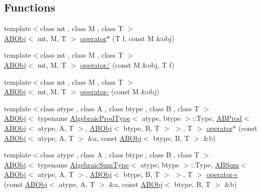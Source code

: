 \subsection*{Functions}
\begin{DoxyCompactItemize}
\item 
{\footnotesize template$<$class mt , class M , class T $>$ }\\\mbox{\hyperlink{classROOT_1_1Minuit2_1_1ABObj}{A\+B\+Obj}}$<$ mt, M, T $>$ \mbox{\hyperlink{namespaceROOT_1_1Minuit2_a03054cc34855692b00d3dd16a0389195}{operator$\ast$}} (T f, const M \&obj)
\item 
{\footnotesize template$<$class mt , class M , class T $>$ }\\\mbox{\hyperlink{classROOT_1_1Minuit2_1_1ABObj}{A\+B\+Obj}}$<$ mt, M, T $>$ \mbox{\hyperlink{namespaceROOT_1_1Minuit2_acfd7451cf386a28e70ea5be0965f631a}{operator/}} (const M \&obj, T f)
\item 
{\footnotesize template$<$class mt , class M , class T $>$ }\\\mbox{\hyperlink{classROOT_1_1Minuit2_1_1ABObj}{A\+B\+Obj}}$<$ mt, M, T $>$ \mbox{\hyperlink{namespaceROOT_1_1Minuit2_a95351951cc1f33b0a2904a47adacd999}{operator-\/}} (const M \&obj)
\item 
{\footnotesize template$<$class atype , class A , class btype , class B , class T $>$ }\\\mbox{\hyperlink{classROOT_1_1Minuit2_1_1ABObj}{A\+B\+Obj}}$<$ typename \mbox{\hyperlink{classROOT_1_1Minuit2_1_1AlgebraicProdType}{Algebraic\+Prod\+Type}}$<$ atype, btype $>$\+::Type, \mbox{\hyperlink{classROOT_1_1Minuit2_1_1ABProd}{A\+B\+Prod}}$<$ \mbox{\hyperlink{classROOT_1_1Minuit2_1_1ABObj}{A\+B\+Obj}}$<$ atype, A, T $>$, \mbox{\hyperlink{classROOT_1_1Minuit2_1_1ABObj}{A\+B\+Obj}}$<$ btype, B, T $>$ $>$, T $>$ \mbox{\hyperlink{namespaceROOT_1_1Minuit2_a4f2bdc9b3267afa787ef956ac703f344}{operator$\ast$}} (const \mbox{\hyperlink{classROOT_1_1Minuit2_1_1ABObj}{A\+B\+Obj}}$<$ atype, A, T $>$ \&a, const \mbox{\hyperlink{classROOT_1_1Minuit2_1_1ABObj}{A\+B\+Obj}}$<$ btype, B, T $>$ \&b)
\item 
{\footnotesize template$<$class atype , class A , class btype , class B , class T $>$ }\\\mbox{\hyperlink{classROOT_1_1Minuit2_1_1ABObj}{A\+B\+Obj}}$<$ typename \mbox{\hyperlink{classROOT_1_1Minuit2_1_1AlgebraicSumType}{Algebraic\+Sum\+Type}}$<$ atype, btype $>$\+::Type, \mbox{\hyperlink{classROOT_1_1Minuit2_1_1ABSum}{A\+B\+Sum}}$<$ \mbox{\hyperlink{classROOT_1_1Minuit2_1_1ABObj}{A\+B\+Obj}}$<$ atype, A, T $>$, \mbox{\hyperlink{classROOT_1_1Minuit2_1_1ABObj}{A\+B\+Obj}}$<$ btype, B, T $>$ $>$, T $>$ \mbox{\hyperlink{namespaceROOT_1_1Minuit2_a0af705023d7183d8394e7b74563c9188}{operator+}} (const \mbox{\hyperlink{classROOT_1_1Minuit2_1_1ABObj}{A\+B\+Obj}}$<$ atype, A, T $>$ \&a, const \mbox{\hyperlink{classROOT_1_1Minuit2_1_1ABObj}{A\+B\+Obj}}$<$ btype, B, T $>$ \&b)

\end{DoxyCompactItemize}
